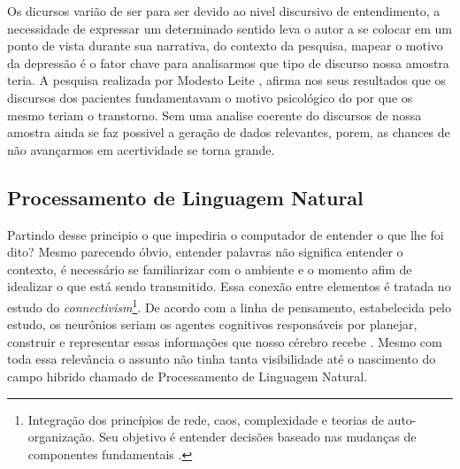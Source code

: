 Os dicursos varião de ser para ser devido ao nivel discursivo de entendimento, a necessidade de expressar um determinado sentido leva o autor a se colocar em um ponto de vista durante sua narrativa, do contexto da pesquisa, mapear o motivo da depressão é o fator chave para analisarmos que tipo de discurso nossa amostra teria. A pesquisa realizada por Modesto Leite \cite[134]{modesto2005adepre}, afirma nos seus resultados que os discursos dos pacientes fundamentavam o motivo psicológico do por que os mesmo teriam o transtorno. Sem uma analise coerente do discursos de nossa amostra ainda se faz possivel a geração de dados relevantes, porem, as chances de não avançarmos em acertividade se torna grande.  

\subsection{Processamento de Linguagem Natural}
Partindo desse principio o que impediria o computador de entender o que lhe foi dito? Mesmo parecendo óbvio, entender palavras não significa entender o contexto, é necessário se familiarizar com o ambiente e o momento afim de idealizar o que está sendo transmitido. Essa conexão entre elementos é tratada no estudo do \textit{connectivism}\footnote{Integração dos princípios de rede, caos, complexidade e teorias de auto-organização. Seu objetivo é entender decisões baseado nas mudanças de componentes fundamentais \cite[5]{siemens2014connectivism}.}. De acordo com a linha de pensamento, estabelecida pelo estudo, os neurônios seriam os agentes cognitivos responsáveis por planejar, construir e representar essas informações que nosso cérebro recebe \cite[22]{brandura1996}. Mesmo com toda essa relevância o assunto não tinha tanta visibilidade até o nascimento  do campo hibrido chamado de Processamento de Linguagem Natural. \cite[16]{russell2003artificial}
